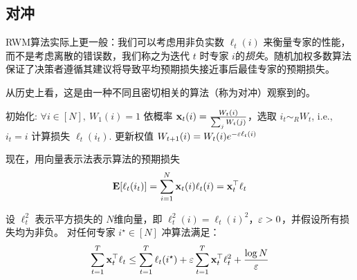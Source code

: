 \subsection{
	对冲
	}

RWM算法实际上更一般：我们可以考虑用非负实数 $\ell_t(i)$ 来衡量专家的性能，而不是考虑离散的错误数，我们称之为迭代 $t$ 时专家 $i$的{\it 损失}。随机加权多数算法保证了决策者遵循其建议将导致平均预期损失接近事后最佳专家的预期损失。

从历史上看，这是由一种不同且密切相关的算法（称为对冲）观察到的。
\begin{algorithm}[h!]
	\caption{
	对冲算法	
	}
	\label{alg:Hedge}
	\begin{algorithmic}[1]
		\STATE 初始化: $\forall i\in [N], \ W_1(i) = 1$
		\STATE 依概率 $\mathbf x_t(i) = \frac{W_t(i) } {\sum_j W_t(j) }$，选取 $i_t \sim_R W_t$, i.e., $i_t = i$ 
		\STATE 计算损失 $\ell_t(i_t)$. 
		\STATE 更新权值 $ W_{t+1}(i) = W_{t}(i) e^{-\varepsilon \ell_t(i)}$
		\ENDFOR
	\end{algorithmic}
\end{algorithm}

现在，用向量表示法表示算法的预期损失
$$ \mathop{\mbox{\bf E}} [ \ell_t(i_t) ] = \sum_{i=1}^N \mathbf x_t(i) \ell_t(i) = \mathbf x_t^\top \ell_t  $$
\begin{theorem} \label{lem:hedge}
设 $\ell_t^2$ 表示平方损失的 $N$维向量，即 $\ell_t^2(i) = \ell_t(i)^2$，$\varepsilon > 0$，并假设所有损失均为非负。
对任何专家 $i^\star \in [N]$ 冲算法满足：
\[
  \sum_{t=1}^T  \mathbf x_t^\top \ell_t   \le \sum_{t=1}^T \ell_t(i^\star) + \varepsilon \sum_{t=1}^T  \mathbf x_t^\top \ell_t^2   + \frac{\log N}{\varepsilon} 
\]
\end{theorem}

